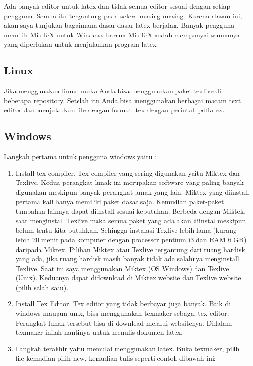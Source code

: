 Ada banyak editor untuk latex dan tidak semua editor sesuai dengan setiap pengguna. Semua itu tergantung pada selera masing-masing. Karena alasan ini, akan saya tunjukan bagaimana dasar-dasar latex berjalan. Banyak pengguna memilih MikTeX untuk Windows karena MikTeX sudah mempunyai semuanya yang diperlukan untuk menjalankan program latex.
\par \vspace{12pt}
\subsection{Linux}
\par \vspace{8pt}
Jika menggunakan linux, maka Anda bisa menggunakan paket texlive di beberapa repository. Setelah itu Anda bisa menggunakan berbagai macam text editor dan menjalankan file dengan format .tex dengan perintah pdflatex.
\par \vspace{12pt}
\subsection{Windows}
\par \vspace{12pt}
Langkah pertama untuk pengguna windows yaitu :

\begin{enumerate}
\item Install tex compiler. Tex compiler yang sering digunakan yaitu Miktex dan Texlive. Kedua perangkat lunak ini merupakan software yang paling banyak digunakan meskipun banyak perangkat lunak yang lain. Miktex yang diinstall pertama kali hanya memiliki paket dasar saja. Kemudian paket-paket tambahan lainnya dapat diinstall sesuai kebutuhan. Berbeda dengan Miktek, saat menginstall Texlive maka semua paket yang
ada akan diinstal meskipun belum tentu kita butuhkan. Sehingga instalasi Texlive lebih lama (kurang lebih 20 menit pada komputer dengan processor pentium i3 dan RAM 6 GB) daripada Miktex. Pilihan Miktex atau Texlive tergantung dari ruang hardisk yang ada, jika ruang hardisk masih banyak tidak ada salahnya menginstall Texlive. Saat ini saya menggunakan Miktex
(OS Windows) dan Texlive (Unix). Keduanya dapat didownload di Miktex website dan Texlive website (pilih salah satu).
\item Install Tex Editor. Tex editor yang tidak berbayar juga banyak. Baik di windows maupun unix, bisa menggunakan texmaker sebagai tex editor. Perangkat lunak tersebut bisa di download melalui websitenya. Didalam texmaker inilah nantinya untuk menulis dokumen latex.
\item Langkah terakhir yaitu memulai menggunakan latex. Buka texmaker, pilih file kemudian pilih new, kemudian tulis seperti contoh dibawah ini:
\setcounter{numberedCntC}{\theenumi}
\end{enumerate}


